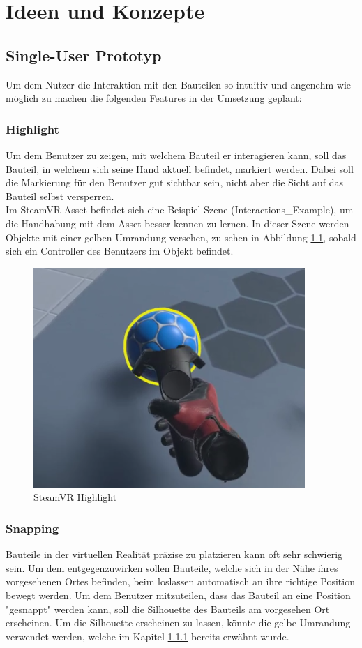 \chapter{Ideen und Konzepte}
\label{ch:Ideen_und_Konzepte}

\section{Single-User Prototyp}
Um dem Nutzer die Interaktion mit den Bauteilen so intuitiv und angenehm wie möglich zu machen die folgenden Features in der Umsetzung geplant:

\subsection{Highlight}
\label{ch:highlight}
Um dem Benutzer zu zeigen, mit welchem Bauteil er interagieren kann, soll das Bauteil, in welchem sich seine Hand aktuell befindet, markiert werden. Dabei soll die Markierung für den Benutzer gut sichtbar sein, nicht aber die Sicht auf das Bauteil selbst versperren. \\
Im SteamVR-Asset befindet sich eine Beispiel Szene (Interactions\_Example), um die Handhabung mit dem Asset besser kennen zu lernen. In dieser Szene werden Objekte mit einer gelben Umrandung versehen, zu sehen in Abbildung \ref{fig:steamvr_highlight}, sobald sich ein Controller des Benutzers im Objekt befindet.

\begin{figure}[h!]
	\centering
	\includegraphics[keepaspectratio,width=0.4\linewidth]{img/SteamVR_Highlight.PNG}
	\caption{SteamVR Highlight}
	\label{fig:steamvr_highlight}
\end{figure}
	
\subsection{Snapping}
Bauteile in der virtuellen Realität präzise zu platzieren kann oft sehr schwierig sein. Um dem entgegenzuwirken sollen Bauteile, welche sich in der Nähe ihres vorgesehenen Ortes befinden, beim loslassen automatisch an ihre richtige Position bewegt werden. Um dem Benutzer mitzuteilen, dass das Bauteil an eine Position "gesnappt" werden kann, soll die Silhouette des Bauteils am vorgesehen Ort erscheinen. Um die Silhouette erscheinen zu lassen, könnte die gelbe Umrandung verwendet werden, welche im Kapitel \ref{ch:highlight} bereits erwähnt wurde. 
	
